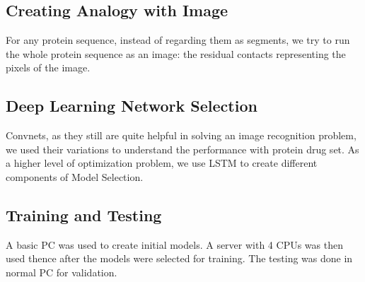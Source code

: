 \subsection{Creating Analogy with Image}
For any protein sequence, instead of regarding them as segments, we try to run the whole protein sequence as an image: the residual contacts representing the pixels of the image.

\subsection{Deep Learning Network Selection}
Convnets, as they still are quite helpful in solving an image recognition problem, we used their variations to understand the performance with protein drug set. As a higher level of optimization problem, we use LSTM to create different components of Model Selection. 

\subsection{Training and Testing}
A basic PC was used to create initial models. A server with 4 CPUs was then used thence after the models were selected for training. The testing was done in normal PC for validation.
